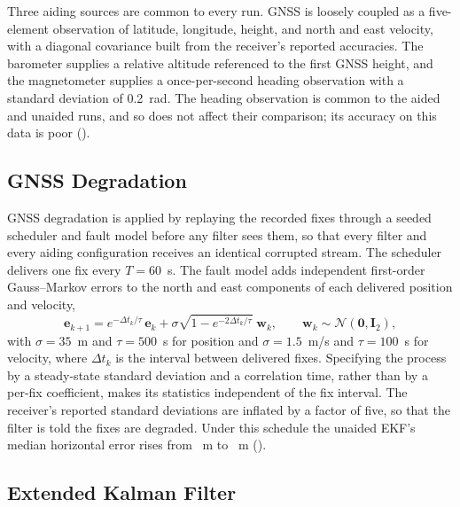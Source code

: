 Three aiding sources are common to every run. GNSS is loosely coupled as a five-element observation of latitude, longitude, height, and north and east velocity, with a diagonal covariance built from the receiver's reported accuracies. The barometer supplies a relative altitude referenced to the first GNSS height, and the magnetometer supplies a once-per-second heading observation with a standard deviation of 0.2~rad. The heading observation is common to the aided and unaided runs, and so does not affect their comparison; its accuracy on this data is poor ().

\subsection{GNSS Degradation}

GNSS degradation is applied by replaying the recorded fixes through a seeded scheduler and fault model before any filter sees them, so that every filter and every aiding configuration receives an identical corrupted stream. The scheduler delivers one fix every \(T = 60\)~s. The fault model adds independent first-order Gauss--Markov errors to the north and east components of each delivered position and velocity,
\begin{equation}
  \mathbf{e}_{k+1} = e^{-\Delta t_k/\tau}\,\mathbf{e}_k + \sigma\sqrt{1 - e^{-2\Delta t_k/\tau}}\;\mathbf{w}_k, \qquad \mathbf{w}_k \sim \mathcal{N}(\mathbf{0}, \mathbf{I}_2),
  \label{eqn:gauss-markov}
\end{equation}
with \(\sigma = 35\)~m and \(\tau = 500\)~s for position and \(\sigma = 1.5\)~m/s and \(\tau = 100\)~s for velocity, where \(\Delta t_k\) is the interval between delivered fixes. Specifying the process by a steady-state standard deviation and a correlation time, rather than by a per-fix coefficient, makes its statistics independent of the fix interval. The receiver's reported standard deviations are inflated by a factor of five, so that the filter is told the fixes are degraded. Under this schedule the unaided EKF's median horizontal error rises from \numekffullmedian~m to \numekfdegradedmedian~m ().

\subsection{Extended Kalman Filter}
\label{sec:ekf}

